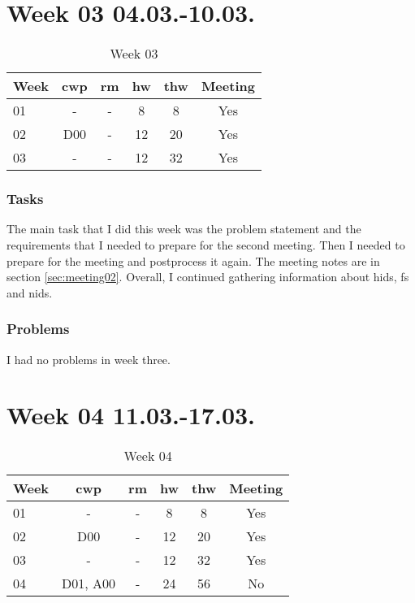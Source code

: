 \section{Week 03 04.03.-10.03.}
\label{sec:journal:week03}
\begin{table}[!ht]
    \begin{center}
        \caption{Week 03}
        \label{tab:journal:week03}
        \begin{tabular}{l|c|c|c|c|c}
            \textbf{Week} & \textbf{\gls{cwp}} & \textbf{\gls{rm}} & \textbf{\gls{hw}} & \textbf{\gls{thw}} & \textbf{Meeting}\\
        \hline
        01 & - & - & 8 & 8 & Yes \\
        02 & D00 & - & 12 & 20 & Yes \\
        03 & - & - & 12 & 32 & Yes \\
        \end{tabular}
    \end{center}
\end{table}

\subsubsection{Tasks}

The main task that I did this week was the problem statement and the requirements that I needed to prepare for the second meeting. Then I needed to prepare for the meeting and postprocess it again. The meeting notes are in section \ref{sec:meeting02}. Overall, I continued gathering information about \gls{hids}, \gls{fs} and \gls{nids}.

\subsubsection{Problems}

I had no problems in week three.

\section{Week 04 11.03.-17.03.}
\label{sec:journal:week04}

\begin{table}[!ht]
    \begin{center}
        \caption{Week 04}
        \label{tab:journal:week04}
        \begin{tabular}{l|c|c|c|c|c}
            \textbf{Week} & \textbf{\gls{cwp}} & \textbf{\gls{rm}} & \textbf{\gls{hw}} & \textbf{\gls{thw}} & \textbf{Meeting}\\
        \hline
        01 & - & - & 8 & 8 & Yes \\
        02 & D00 & - & 12 & 20 & Yes \\
        03 & - & - & 12 & 32 & Yes \\
        04 & D01, A00 & - & 24 & 56 & No \\
        \end{tabular}
    \end{center}
\end{table}

